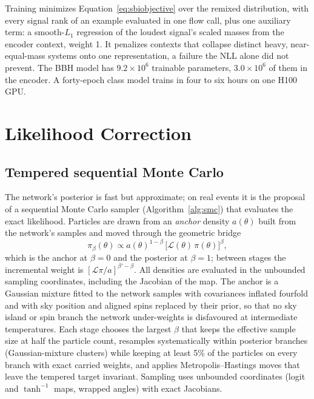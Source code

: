 \documentclass[twocolumn,linenumbers]{aastex701}
\begin{document}
Training minimizes Equation~\ref{eq:sbiobjective} over the remixed
distribution, with every signal rank of an example evaluated in one flow call,
plus one auxiliary term: a smooth-$L_1$ regression of the loudest signal's
scaled masses from the encoder context, weight 1. It penalizes contexts that
collapse distinct heavy, near-equal-mass systems onto one representation, a
failure the NLL alone did not prevent. The BBH model has $9.2\times10^6$
trainable parameters, $3.0\times10^6$ of them in the encoder. A forty-epoch
class model trains in four to six hours on one H100 GPU.

\section{Likelihood Correction} \label{sec:correction}

\subsection{Tempered sequential Monte Carlo}

The network's posterior is fast but approximate; on real events it is the
proposal of a sequential Monte Carlo sampler \citep{DelMoral2006Smc}
(Algorithm~\ref{alg:smc}) that evaluates the exact likelihood. Particles are
drawn from an \emph{anchor} density $a(\theta)$ built from the network's
samples and moved through the geometric bridge
\begin{equation}
\pi_\beta(\theta) \propto a(\theta)^{1-\beta}\,\big[\mathcal{L}(\theta)\,\pi(\theta)\big]^{\beta},
\label{eq:bridge}
\end{equation}
which is the anchor at $\beta=0$ and the posterior at $\beta=1$; between
stages the incremental weight is $[\mathcal{L}\pi/a]^{\beta'-\beta}$. All
densities are evaluated in the unbounded sampling coordinates, including the
Jacobian of the map. The anchor is a Gaussian mixture fitted to the network samples with
covariances inflated fourfold and with sky position and aligned spins
replaced by their prior, so that no sky island or spin branch the network
under-weights is disfavoured at intermediate temperatures. Each stage chooses
the largest $\beta$ that keeps the effective sample size at half the particle
count, resamples systematically within posterior branches (Gaussian-mixture
clusters) while keeping at least 5\% of the particles on every branch with
exact carried weights, and applies Metropolis--Hastings moves that leave the
tempered target invariant. Sampling uses unbounded coordinates (logit and
$\tanh^{-1}$ maps, wrapped angles) with exact Jacobians.
\end{document}
